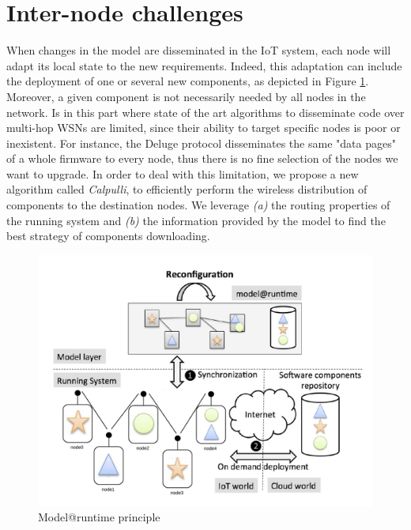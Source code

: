 \section{Inter-node challenges}
When changes in the model are disseminated in the IoT system, each node will adapt its local state to the new requirements. 
Indeed, this adaptation can include the deployment of one or several new components, as depicted in Figure \ref{fig:MAROverview2}. 
Moreover, a given component is not necessarily needed by all nodes in the network. 
Is in this part where state of the art algorithms to disseminate code over multi-hop WSNs are limited, since their ability to target specific nodes is poor or inexistent. 
For instance, the Deluge protocol \cite{hui2004dynamic} disseminates the same "data pages" of a whole firmware to every node, thus there is no fine selection of the nodes we want to upgrade. 
In order to deal with this limitation, we propose a new algorithm called \emph{Calpulli}, to efficiently perform the wireless distribution of components to the destination nodes. 
We leverage \textit{(a)} the routing properties of the running system and \textit{(b)} the information provided by the model to find the best strategy of components downloading.

\begin{figure}[htb]
	\centering
	\includegraphics[width=0.95\columnwidth]{chapters/inter-node.images/MAR_Overview2.pdf}
	\caption{Model@runtime principle} \label{fig:MAROverview2}
\end{figure}


